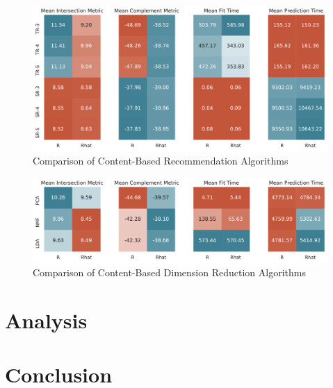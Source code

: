 \documentclass[11pt]{article}
\begin{document}
\begin{figure}[t]
\centering
\includegraphics[width=1\textwidth]{figs/recipe_rdr.pdf}
\caption{Comparison of Content-Based Recommendation Algorithms}
\label{fig:recipe_rdr}
\end{figure}

\begin{figure}[t]
\centering
\includegraphics[width=1\textwidth]{figs/recipe_dr.pdf}
\caption{Comparison of Content-Based Dimension Reduction Algorithms}
\label{fig:recipe_dr}
\end{figure}


\section{Analysis}

\section{Conclusion}



\end{document}
